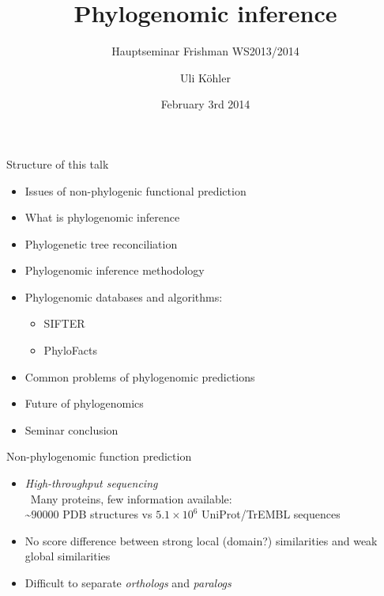 \documentclass[14pt,xcolor=dvipsnames,pdftex]{beamer}
\title{Phylogenomic inference}
\subtitle{Hauptseminar Frishman WS2013/2014}
\author{Uli Köhler}
\date{February 3rd 2014}
\begin{document}
\bgroup
{}

\begin{frame}[plain]{}
\end{frame}

\egroup

\frame{\titlepage}

\begin{frame}{Structure of this talk}
\begin{itemize}
\item Issues of non-phylogenic functional prediction
\item What is phylogenomic inference
\item Phylogenetic tree reconciliation
\item Phylogenomic inference methodology
\item Phylogenomic databases and algorithms:
\begin{itemize}
 \item SIFTER
 \item PhyloFacts
\end{itemize}
\item Common problems of phylogenomic predictions
\item Future of phylogenomics
\item Seminar conclusion
\end{itemize}
\end{frame}

\begin{frame}{Non-phylogenomic function prediction}
 \begin{itemize}
  \item \textit{High-throughput sequencing}\\
  \textrightarrow\ Many proteins, few information available:\\
  \textasciitilde $90000$ PDB structures vs $5.1\times10^6$ UniProt/TrEMBL sequences
  \item No score difference between strong local (domain?) similarities and weak global similarities
  \item Difficult to separate \textit{orthologs} and \textit{paralogs}
 \end{itemize}
\end{frame}
\end{document}
